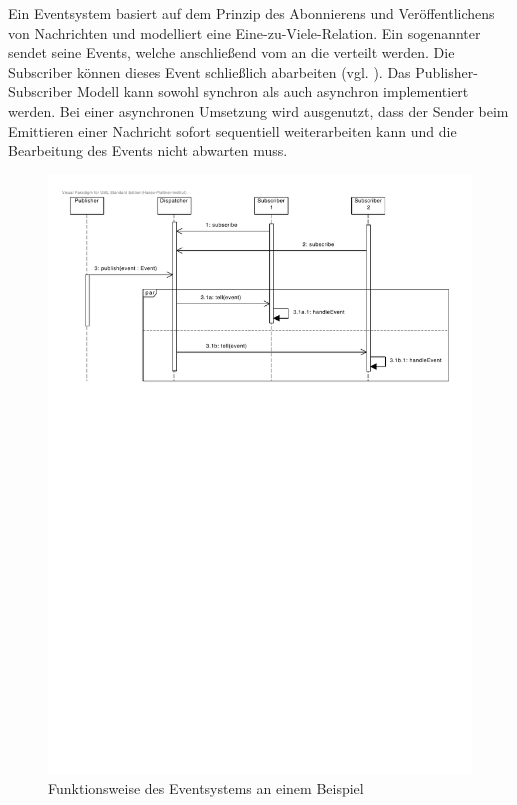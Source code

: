 Ein \gls{Eventsystem} basiert auf dem Prinzip des Abonnierens und Veröffentlichens von Nachrichten und modelliert eine Eine-zu-Viele-Relation. Ein sogenannter  sendet seine Events, welche anschließend vom  an die  verteilt werden. Die Subscriber können dieses Event schließlich abarbeiten (vgl. \cite[p.~327]{gang-of-four}). Das Publisher-Subscriber Modell kann sowohl synchron als auch asynchron implementiert werden. Bei einer asynchronen Umsetzung wird ausgenutzt, dass der Sender beim Emittieren einer Nachricht sofort sequentiell weiterarbeiten kann und die Bearbeitung des Events nicht abwarten muss.

\begin{figure}[h]  
  \centering     
  \includegraphics[width=1.0\textwidth]{img/eventsystem.pdf}  
   \caption{Funktionsweise des \gls{Eventsystem}s an einem Beispiel}   
  \label{fig:event-system} 
\end{figure}

